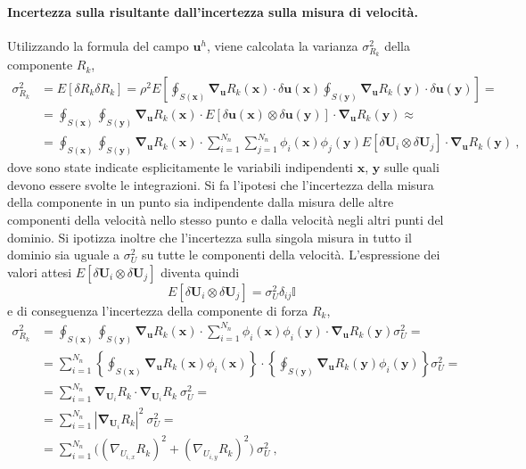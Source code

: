 \paragraph{Incertezza sulla risultante dall'incertezza sulla misura di velocità.}
Utilizzando la formula del campo $\bm{u}^h$, viene calcolata la varianza $\sigma^2_{R_k}$ della componente $R_k$,
\begin{equation}
\begin{aligned}
 \sigma^2_{R_k} & = E[\delta R_k \delta R_k] = \rho^2 E\left[ \oint_{S(\bm{x})} \bm{\nabla}_{\bm{u}} R_k (\bm{x}) \cdot \delta \bm{u}(\bm{x}) \oint_{S(\bm{y})} \bm{\nabla}_{\bm{u}} R_k (\bm{y}) \cdot \delta \bm{u}(\bm{y}) \right] = \\
 & = \oint_{S(\bm{x})} \oint_{S(\bm{y})}  \bm{\nabla}_{\bm{u}} R_k (\bm{x}) \cdot E\left[ \delta \bm{u}(\bm{x}) \otimes \delta \bm{u}(\bm{y}) \right] \cdot \bm{\nabla}_{\bm{u}} R_k (\bm{y}) \approx \\
 & = \oint_{S(\bm{x})} \oint_{S(\bm{y})}  \bm{\nabla}_{\bm{u}} R_k (\bm{x}) \cdot \sum_{i=1}^{N_n} \sum_{j=1}^{N_n} \phi_i(\bm{x}) \phi_j(\bm{y}) E\left[ \delta \bm{U}_i \otimes \delta \bm{U}_j \right] \cdot \bm{\nabla}_{\bm{u}} R_k (\bm{y}) \ ,
\end{aligned}
\end{equation}
dove sono state indicate esplicitamente le variabili indipendenti $\bm{x}$, $\bm{y}$ sulle quali devono essere svolte le integrazioni.
\newline
Si fa l'ipotesi che l'incertezza della misura della componente in un punto sia indipendente dalla misura delle altre componenti della velocità nello stesso punto e dalla velocità negli altri punti del dominio. Si ipotizza inoltre che l'incertezza sulla singola misura in tutto il dominio sia uguale a $\sigma^2_U$ su tutte le componenti della velocità.
L'espressione dei valori attesi $E[\delta \bm{U}_i \otimes \delta \bm{U}_j]$ diventa quindi
\begin{equation}
  E[\delta \bm{U}_i \otimes \delta \bm{U}_j] = \sigma_U^2 \delta_{ij} \mathbb{I} 
\end{equation}
e di conseguenza l'incertezza della componente di forza $R_k$,
\begin{equation}
\begin{aligned}
 \sigma^2_{R_k} & = \oint_{S(\bm{x})} \oint_{S(\bm{y})}  \bm{\nabla}_{\bm{u}} R_k (\bm{x}) \cdot \sum_{i=1}^{N_n} \phi_i(\bm{x}) \phi_i(\bm{y}) \cdot \bm{\nabla}_{\bm{u}} R_k (\bm{y}) \sigma^2_U  = \\  
  & = \sum_{i=1}^{N_n}\left\{ \oint_{S(\bm{x})} \bm{\nabla}_{\bm{u}} R_k (\bm{x})   \phi_i(\bm{x}) \right\} \cdot \left\{ \oint_{S(\bm{y})} \bm{\nabla}_{\bm{u}} R_k (\bm{y}) \phi_i(\bm{y}) \right\} \sigma^2_U  = \\   
  & = \sum_{i=1}^{N_n} \bm{\nabla}_{\bm{U}_i} R_k \cdot \bm{\nabla}_{\bm{U}_i} R_k \ \sigma^2_U  = \\ 
  & = \sum_{i=1}^{N_n} | \bm{\nabla}_{\bm{U}_i} R_k |^2 \ \sigma^2_U = \\
  & = \sum_{i=1}^{N_n} \big( (\nabla_{U_{i,x}} R_k) ^2 + (\nabla_{U_{i,y}} R_k) ^2 \big) \ \sigma^2_U \ , 
\end{aligned}
\end{equation}
